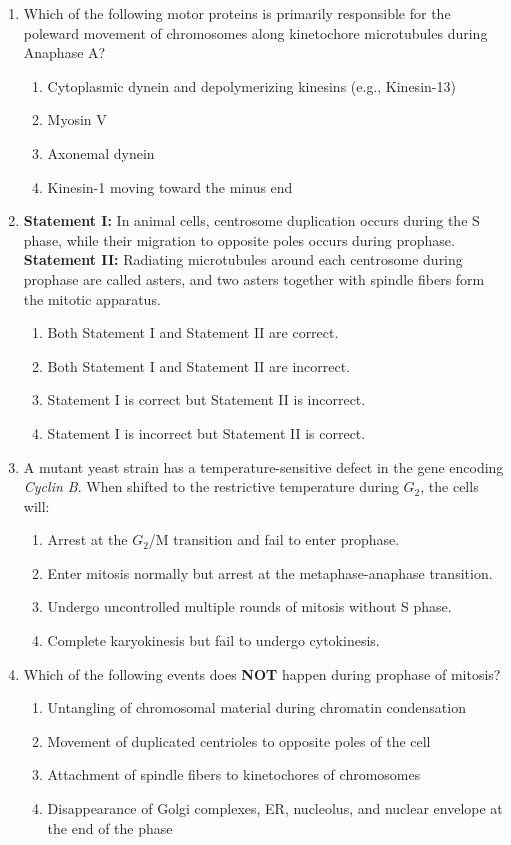 \documentclass[11pt,a4paper]{article}
\begin{document}
\begin{enumerate}[label=\textbf{\arabic*.}, leftmargin=*]
\item Which of the following motor proteins is primarily responsible for the poleward movement of chromosomes along kinetochore microtubules during Anaphase A?
\begin{enumerate}[label=(\alph*)]
    \item Cytoplasmic dynein and depolymerizing kinesins (e.g., Kinesin-13)
    \item Myosin V
    \item Axonemal dynein
    \item Kinesin-1 moving toward the minus end
\end{enumerate}

\item \textbf{Statement I:} In animal cells, centrosome duplication occurs during the S phase, while their migration to opposite poles occurs during prophase.\\
\textbf{Statement II:} Radiating microtubules around each centrosome during prophase are called asters, and two asters together with spindle fibers form the mitotic apparatus.
\begin{enumerate}[label=(\alph*)]
    \item Both Statement I and Statement II are correct.
    \item Both Statement I and Statement II are incorrect.
    \item Statement I is correct but Statement II is incorrect.
    \item Statement I is incorrect but Statement II is correct.
\end{enumerate}

\item A mutant yeast strain has a temperature-sensitive defect in the gene encoding \textit{Cyclin B}. When shifted to the restrictive temperature during $G_2$, the cells will:
\begin{enumerate}[label=(\alph*)]
    \item Arrest at the $G_2$/M transition and fail to enter prophase.
    \item Enter mitosis normally but arrest at the metaphase-anaphase transition.
    \item Undergo uncontrolled multiple rounds of mitosis without S phase.
    \item Complete karyokinesis but fail to undergo cytokinesis.
\end{enumerate}

\item Which of the following events does \textbf{NOT} happen during prophase of mitosis?
\begin{enumerate}[label=(\alph*)]
    \item Untangling of chromosomal material during chromatin condensation
    \item Movement of duplicated centrioles to opposite poles of the cell
    \item Attachment of spindle fibers to kinetochores of chromosomes
    \item Disappearance of Golgi complexes, ER, nucleolus, and nuclear envelope at the end of the phase
\end{enumerate}


\end{enumerate}
\end{document}
